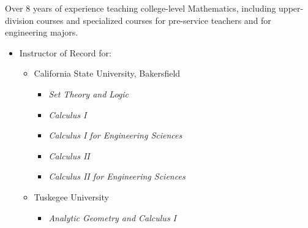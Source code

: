 \documentclass[11pt]{article}
\begin{document}
  Over 8 years of experience teaching college-level Mathematics,
  including upper-division courses
  and specialized courses for pre-service teachers
  and for engineering majors.
  \begin{itemize}
    \item{} Instructor of Record for:
    \begin{itemize}
      \item{} California State University, Bakersfield
      \begin{itemize}
        \item{} \emph{Set Theory and Logic}
        \item{} \emph{Calculus I}
        \item{} \emph{Calculus I for Engineering Sciences}
        \item{} \emph{Calculus II}
        \item{} \emph{Calculus II for Engineering Sciences}
      \end{itemize}
      \item{} Tuskegee University
      \begin{itemize}
        \item{} \emph{Analytic Geometry and Calculus I}

\end{itemize}
\end{itemize}
\end{itemize}
\end{document}
